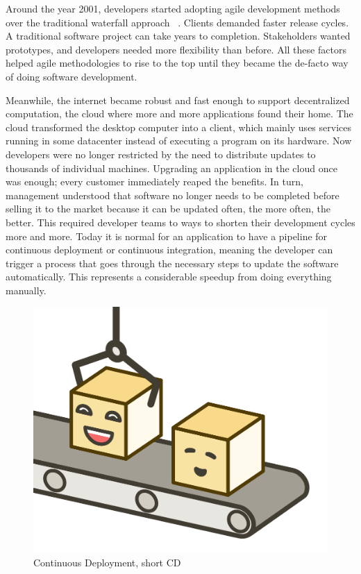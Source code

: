 Around the year 2001, developers started adopting agile development methods over the traditional waterfall approach ~\cite{agile.2020}. Clients demanded faster release cycles. A traditional software project can take years to completion. Stakeholders wanted prototypes, and developers needed more flexibility than before. All these factors helped agile methodologies to rise to the top until they became the de-facto way of doing software development.

Meanwhile, the internet became robust and fast enough to support decentralized computation, the cloud where more and more applications found their home. The cloud transformed the desktop computer into a client, which mainly uses services running in some datacenter instead of executing a program on its hardware. Now developers were no longer restricted by the need to distribute updates to thousands of individual machines. Upgrading an application in the cloud once was enough; every customer immediately reaped the benefits. In turn, management understood that software no longer needs to be completed before selling it to the market because it can be updated often, the more often, the better. This required developer teams to ways to shorten their development cycles more and more. Today it is normal for an application to have a pipeline for continuous deployment or continuous integration, meaning the developer can trigger a process that goes through the necessary steps to update the software automatically. This represents a considerable speedup from doing everything manually.

\begin{figure}[ht]
  \centering
  \includegraphics[width=0.4\linewidth]{assets/illustration-microservice-cd.png}
  \caption{Continuous Deployment, short CD}
\end{figure}

